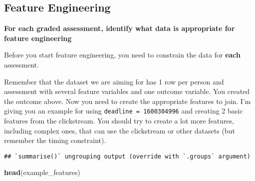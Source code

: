 \documentclass[
]{article}
\newenvironment{Shaded}{\begin{snugshade}}{\end{snugshade}}
\newcommand{\CommentTok}[1]{\textcolor[rgb]{0.56,0.35,0.01}{\textit{#1}}}
\newcommand{\DataTypeTok}[1]{\textcolor[rgb]{0.13,0.29,0.53}{#1}}
\newcommand{\DecValTok}[1]{\textcolor[rgb]{0.00,0.00,0.81}{#1}}
\newcommand{\KeywordTok}[1]{\textcolor[rgb]{0.13,0.29,0.53}{\textbf{#1}}}
\newcommand{\NormalTok}[1]{#1}
\newcommand{\OperatorTok}[1]{\textcolor[rgb]{0.81,0.36,0.00}{\textbf{#1}}}
\newcommand{\StringTok}[1]{\textcolor[rgb]{0.31,0.60,0.02}{#1}}
\begin{document}
\hypertarget{feature-engineering}{%
\subsection{Feature Engineering}\label{feature-engineering}}

\textbf{For each graded assessment, identify what data is appropriate
for feature engineering}

Before you start feature engineering, you need to constrain the data for
\textbf{each} assessment.

Remember that the dataset we are aiming for has 1 row per person and
assessment with several feature variables and one outcome variable. You
created the outcome above. Now you need to create the appropriate
features to join. I'm giving you an example for using
\texttt{deadline\ =\ 1600304996} and creating 2 basic features from the
clickstream. You should try to create a lot more features, including
complex ones, that can use the clickstream or other datasets (but
remember the timing constraint).

\begin{Shaded}
\end{Shaded}

\begin{verbatim}
## `summarise()` ungrouping output (override with `.groups` argument)
\end{verbatim}

\begin{Shaded}
\begin{Highlighting}[]
\KeywordTok{head}\NormalTok{(example_features)}
\end{Highlighting}
\end{Shaded}
\end{document}
